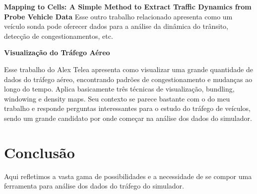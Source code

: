 \textbf{Mapping to Cells: A Simple Method to Extract Traffic Dynamics from Probe Vehicle Data}
 Esse outro trabalho relacionado apresenta como um veículo sonda pode oferecer
dados para a análise da dinâmica do trânsito, detecção de congestionamentos, etc.

\textbf{Visualização do Tráfego Aéreo}

 Esse trabalho do Alex Telea apresenta como visualizar uma grande quantidade
de dados do tráfego aéreo, encontrando padrões de congestionamento e mudanças
ao longo do tempo. Aplica basicamente três técnicas de visualização, bundling,
windowing e density maps. Seu contexto se parece bastante com o do meu trabalho
e responde perguntas interessantes para o estudo do tráfego de veículos, sendo
um grande candidato por onde começar na análise dos dados do simulador. 


%
%
%  
%
%


\section{Conclusão}

Aqui refletimos a vasta gama de possibilidades e a necessidade de se compor
uma ferramenta para análise dos dados do tráfego do simulador.

